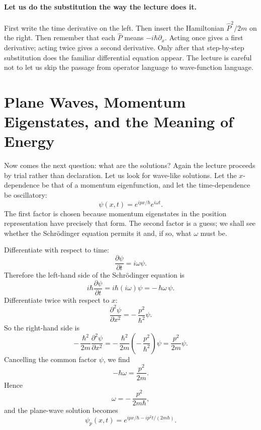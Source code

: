 \paragraph{Let us do the substitution the way the lecture does it.}
First write the time derivative on the left. Then insert the Hamiltonian \(\hat P^2/2m\) on the right. Then remember that each \(\hat P\) means \(-i\hbar \partial_x\). Acting once gives a first derivative; acting twice gives a second derivative. Only after that step-by-step substitution does the familiar differential equation appear. The lecture is careful not to let us skip the passage from operator language to wave-function language.

\section{Plane Waves, Momentum Eigenstates, and the Meaning of Energy}

Now comes the next question: what are the solutions? Again the lecture proceeds by trial rather than declaration. Let us look for wave-like solutions. Let the \(x\)-dependence be that of a momentum eigenfunction, and let the time-dependence be oscillatory:
\begin{equation}
\psi(x,t)=e^{ipx/\hbar}e^{i\omega t}.
\end{equation}
The first factor is chosen because momentum eigenstates in the position representation have precisely that form. The second factor is a guess; we shall see whether the Schr\"odinger equation permits it and, if so, what \(\omega\) must be.

Differentiate with respect to time:
\begin{equation}
\frac{\partial \psi}{\partial t}=i\omega \psi.
\end{equation}
Therefore the left-hand side of the Schr\"odinger equation is
\begin{equation}
i\hbar \frac{\partial \psi}{\partial t}
=
i\hbar(i\omega)\psi
=
-\,\hbar\omega\,\psi.
\end{equation}
Differentiate twice with respect to \(x\):
\begin{equation}
\frac{\partial^2 \psi}{\partial x^2}
=
-\,\frac{p^2}{\hbar^2}\psi.
\end{equation}
So the right-hand side is
\begin{equation}
-\,\frac{\hbar^2}{2m}\frac{\partial^2 \psi}{\partial x^2}
=
-\,\frac{\hbar^2}{2m}
\left(
-\,\frac{p^2}{\hbar^2}
\right)\psi
=
\frac{p^2}{2m}\psi.
\end{equation}
Cancelling the common factor \(\psi\), we find
\begin{equation}
-\hbar\omega = \frac{p^2}{2m}.
\end{equation}
Hence
\begin{equation}
\omega = -\,\frac{p^2}{2m\hbar},
\end{equation}
and the plane-wave solution becomes
\begin{equation}
\psi_p(x,t)
=
e^{ipx/\hbar - i p^2 t/(2m\hbar)}.
\end{equation}

